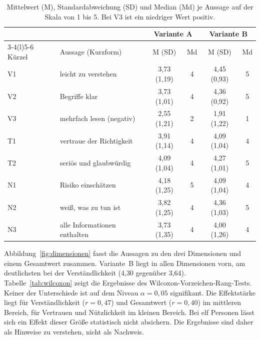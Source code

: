 \begin{table}[htbp]
  \centering
  \small
  \caption{Mittelwert (M), Standardabweichung (SD) und Median (Md) je Aussage auf der Skala von 1 bis 5. Bei V3 ist ein niedriger Wert positiv.}
  \label{tab:itemergebnisse}
  \begin{tabular}{@{}llcccc@{}}
    \toprule
    & & \multicolumn{2}{c}{Variante A} & \multicolumn{2}{c}{Variante B} \\
    \cmidrule(lr){3-4}\cmidrule(l){5-6}
    Kürzel & Aussage (Kurzform) & M (SD) & Md & M (SD) & Md \\
    \midrule
    V1 & leicht zu verstehen          & 3{,}73 (1{,}19) & 4 & 4{,}45 (0{,}93) & 5 \\
    V2 & Begriffe klar                & 3{,}73 (1{,}01) & 4 & 4{,}36 (0{,}92) & 5 \\
    V3 & mehrfach lesen (negativ)     & 2{,}55 (1{,}21) & 2 & 1{,}91 (1{,}22) & 1 \\
    T1 & vertraue der Richtigkeit     & 3{,}91 (1{,}14) & 4 & 4{,}09 (1{,}04) & 4 \\
    T2 & seriös und glaubwürdig       & 4{,}09 (1{,}04) & 4 & 4{,}27 (1{,}01) & 5 \\
    N1 & Risiko einschätzen           & 4{,}18 (1{,}25) & 5 & 4{,}09 (1{,}04) & 4 \\
    N2 & weiß, was zu tun ist         & 3{,}82 (1{,}25) & 4 & 4{,}36 (1{,}03) & 5 \\
    N3 & alle Informationen enthalten & 3{,}73 (1{,}35) & 4 & 4{,}00 (1{,}26) & 4 \\
    \bottomrule
  \end{tabular}
\end{table}

Abbildung~\ref{fig:dimensionen} fasst die Aussagen zu den drei Dimensionen und einem Gesamtwert zusammen. Variante~B liegt in allen Dimensionen vorn, am deutlichsten bei der Verständlichkeit (4{,}30 gegenüber 3{,}64). Tabelle~\ref{tab:wilcoxon} zeigt die Ergebnisse des Wilcoxon-Vorzeichen-Rang-Tests. Keiner der Unterschiede ist auf dem Niveau \(\alpha = 0{,}05\) signifikant. Die Effektstärke liegt für Verständlichkeit (\(r = 0{,}47\)) und Gesamtwert (\(r = 0{,}40\)) im mittleren Bereich, für Vertrauen und Nützlichkeit im kleinen Bereich. Bei elf Personen lässt sich ein Effekt dieser Größe statistisch nicht absichern. Die Ergebnisse sind daher als Hinweise zu verstehen, nicht als Nachweis.

